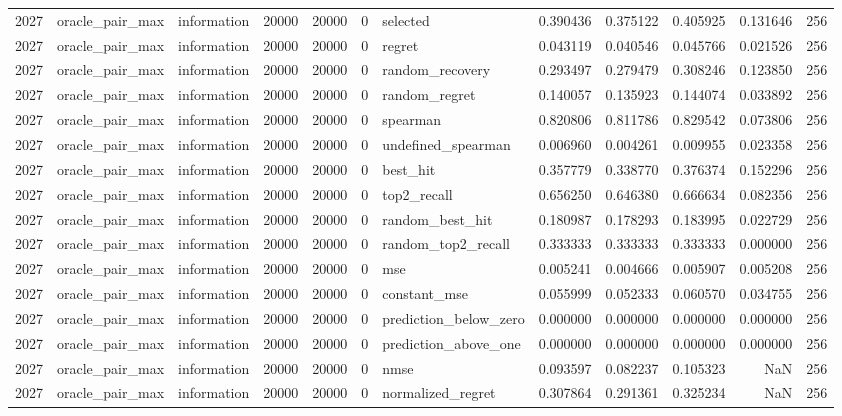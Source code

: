 \begin{tabular}{rllrrrlrrrrr}
2027 & oracle_pair_max & information & 20000 & 20000 & 0 & selected & 0.390436 & 0.375122 & 0.405925 & 0.131646 & 256 \\
2027 & oracle_pair_max & information & 20000 & 20000 & 0 & regret & 0.043119 & 0.040546 & 0.045766 & 0.021526 & 256 \\
2027 & oracle_pair_max & information & 20000 & 20000 & 0 & random_recovery & 0.293497 & 0.279479 & 0.308246 & 0.123850 & 256 \\
2027 & oracle_pair_max & information & 20000 & 20000 & 0 & random_regret & 0.140057 & 0.135923 & 0.144074 & 0.033892 & 256 \\
2027 & oracle_pair_max & information & 20000 & 20000 & 0 & spearman & 0.820806 & 0.811786 & 0.829542 & 0.073806 & 256 \\
2027 & oracle_pair_max & information & 20000 & 20000 & 0 & undefined_spearman & 0.006960 & 0.004261 & 0.009955 & 0.023358 & 256 \\
2027 & oracle_pair_max & information & 20000 & 20000 & 0 & best_hit & 0.357779 & 0.338770 & 0.376374 & 0.152296 & 256 \\
2027 & oracle_pair_max & information & 20000 & 20000 & 0 & top2_recall & 0.656250 & 0.646380 & 0.666634 & 0.082356 & 256 \\
2027 & oracle_pair_max & information & 20000 & 20000 & 0 & random_best_hit & 0.180987 & 0.178293 & 0.183995 & 0.022729 & 256 \\
2027 & oracle_pair_max & information & 20000 & 20000 & 0 & random_top2_recall & 0.333333 & 0.333333 & 0.333333 & 0.000000 & 256 \\
2027 & oracle_pair_max & information & 20000 & 20000 & 0 & mse & 0.005241 & 0.004666 & 0.005907 & 0.005208 & 256 \\
2027 & oracle_pair_max & information & 20000 & 20000 & 0 & constant_mse & 0.055999 & 0.052333 & 0.060570 & 0.034755 & 256 \\
2027 & oracle_pair_max & information & 20000 & 20000 & 0 & prediction_below_zero & 0.000000 & 0.000000 & 0.000000 & 0.000000 & 256 \\
2027 & oracle_pair_max & information & 20000 & 20000 & 0 & prediction_above_one & 0.000000 & 0.000000 & 0.000000 & 0.000000 & 256 \\
2027 & oracle_pair_max & information & 20000 & 20000 & 0 & nmse & 0.093597 & 0.082237 & 0.105323 & NaN & 256 \\
2027 & oracle_pair_max & information & 20000 & 20000 & 0 & normalized_regret & 0.307864 & 0.291361 & 0.325234 & NaN & 256 \\

\end{tabular}
